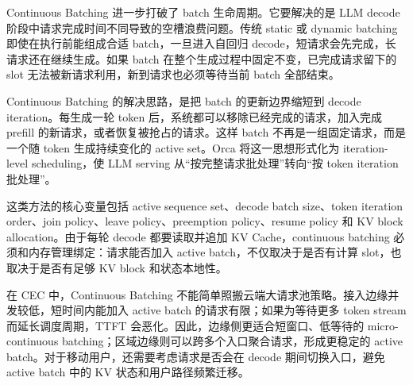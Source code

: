 \documentclass[a4paper,10pt]{ctexart}
\begin{document}
Continuous Batching 进一步打破了 batch 生命周期。它要解决的是 LLM decode 阶段中请求完成时间不同导致的空槽浪费问题。传统 static 或 dynamic batching 即使在执行前能组成合适 batch，一旦进入自回归 decode，短请求会先完成，长请求还在继续生成。如果 batch 在整个生成过程中固定不变，已完成请求留下的 slot 无法被新请求利用，新到请求也必须等待当前 batch 全部结束。


Continuous Batching 的解决思路，是把 batch 的更新边界缩短到 decode iteration。每生成一轮 token 后，系统都可以移除已经完成的请求，加入完成 prefill 的新请求，或者恢复被抢占的请求。这样 batch 不再是一组固定请求，而是一个随 token 生成持续变化的 active set。Orca 将这一思想形式化为 iteration-level scheduling，使 LLM serving 从“按完整请求批处理”转向“按 token iteration 批处理”。


这类方法的核心变量包括 active sequence set、decode batch size、token iteration order、join policy、leave policy、preemption policy、resume policy 和 KV block allocation。由于每轮 decode 都要读取并追加 KV Cache，continuous batching 必须和内存管理绑定：请求能否加入 active batch，不仅取决于是否有计算 slot，也取决于是否有足够 KV block 和状态本地性。


在 CEC 中，Continuous Batching 不能简单照搬云端大请求池策略。接入边缘并发较低，短时间内能加入 active batch 的请求有限；如果为等待更多 token stream 而延长调度周期，TTFT 会恶化。因此，边缘侧更适合短窗口、低等待的 micro-continuous batching；区域边缘则可以跨多个入口聚合请求，形成更稳定的 active batch。对于移动用户，还需要考虑请求是否会在 decode 期间切换入口，避免 active batch 中的 KV 状态和用户路径频繁迁移。
\end{document}
